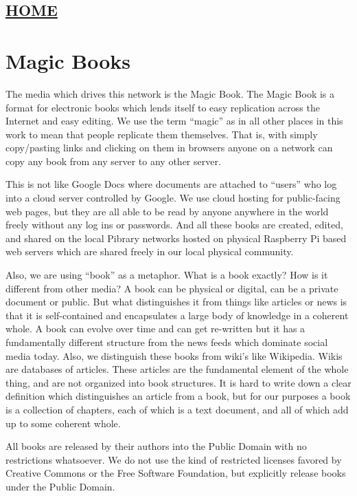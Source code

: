\hypertarget{home}{%
\subsection{\texorpdfstring{\href{scrolls/home}{HOME}}{HOME}}\label{home}}

\hypertarget{magic-books}{%
\section{Magic Books}\label{magic-books}}

The media which drives this network is the Magic Book. The Magic Book is
a format for electronic books which lends itself to easy replication
across the Internet and easy editing. We use the term ``magic'' as in
all other places in this work to mean that people replicate them
themselves. That is, with simply copy/pasting links and clicking on them
in browsers anyone on a network can copy any book from any server to any
other server.

This is not like Google Docs where documents are attached to ``users''
who log into a cloud server controlled by Google. We use cloud hosting
for public-facing web pages, but they are all able to be read by anyone
anywhere in the world freely without any log ins or passwords. And all
these books are created, edited, and shared on the local Pibrary
networks hosted on physical Raspberry Pi based web servers which are
shared freely in our local physical community.

Also, we are using ``book'' as a metaphor. What is a book exactly? How
is it different from other media? A book can be physical or digital, can
be a private document or public. But what distinguishes it from things
like articles or news is that it is self-contained and encapsulates a
large body of knowledge in a coherent whole. A book can evolve over time
and can get re-written but it has a fundamentally different structure
from the news feeds which dominate social media today. Also, we
distinguish these books from wiki's like Wikipedia. Wikis are databases
of articles. These articles are the fundamental element of the whole
thing, and are not organized into book structures. It is hard to write
down a clear definition which distinguishes an article from a book, but
for our purposes a book is a collection of chapters, each of which is a
text document, and all of which add up to some coherent whole.

All books are released by their authors into the Public Domain with no
restrictions whatsoever. We do not use the kind of restricted licenses
favored by Creative Commons or the Free Software Foundation, but
explicitly release books under the Public Domain.

